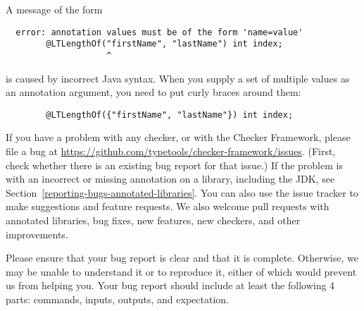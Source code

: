 
A message of the form

\begin{Verbatim}
  error: annotation values must be of the form 'name=value'
        @LTLengthOf("firstName", "lastName") int index;
                    ^
\end{Verbatim}

\noindent
is caused by incorrect Java syntax.  When you supply a set of multiple
values as an annotation argument, you need to put curly braces around them:

\begin{Verbatim}
        @LTLengthOf({"firstName", "lastName"}) int index;
\end{Verbatim}



If you have a problem with any checker, or with the Checker Framework,
please file a bug at
\url{https://github.com/typetools/checker-framework/issues}.
(First, check whether there is an existing bug report for that issue.)
If the problem is with an incorrect or missing annotation on a library,
including the JDK, see Section~\ref{reporting-bugs-annotated-libraries}.
You can also use the issue tracker to make suggestions and feature
requests.  We also welcome pull requests with annotated libraries, bug
fixes, new features, new checkers, and other improvements.

Please ensure that your bug report is clear and that it is complete.
Otherwise, we may be unable to understand it or to reproduce it, either of
which would prevent us from helping you.  Your bug report should include at
least the following 4 parts: commands, inputs, outputs, and expectation.

